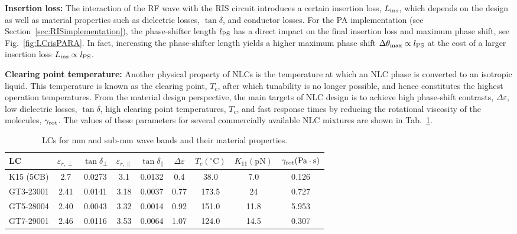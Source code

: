 \textbf{Insertion loss:} The interaction of the \gls{RF} wave with the \gls{RIS} circuit introduces a certain insertion loss, $L_{\rm ins}$, which depends on the design as well as material properties such as dielectric losses, $\tan\delta$, and conductor losses. For the \gls{PA} implementation (see Section~\ref{sec:RISimplementation}), the phase-shifter length $l_{\rm PS}$ has a direct impact on the final insertion loss and maximum phase shift, see Fig.~\ref{fig:LCrisPARA}. In fact, increasing the phase-shifter length yields a higher maximum phase shift $\Delta\theta_{\max}\propto l_{\rm PS}$ at the cost of a larger insertion loss $L_{\rm ins} \propto l_{\rm PS}$. 

\textbf{Clearing point temperature:} Another physical property of \glspl{NLC} is the temperature at which an \gls{NLC} phase is converted to an isotropic liquid.  This temperature is known as the clearing point, $T_c$, after which tunability is no longer possible, and hence constitutes the highest operation temperatures. 
From the material design perspective, the main targets of \gls{NLC} design is to achieve high phase-shift contrasts, $\Delta\varepsilon $, low dielectric losses, $\tan\delta$, high clearing point temperatures, $T_c$,  and fast response times by reducing the rotational viscosity of the molecules, $\gamma_{\rm rot}$. 
The values of these parameters for several commercially available \gls{NLC} mixtures are shown in Tab.~\ref{tab:LCtypes}.

\begin{table}
\centering
\caption{LCs for mm and sub-mm wave bands and their material properties. \cite{jakoby2020microwave}}
\label{tab:LCtypes}
\begin{tabular}{@{}lcccccccc@{}} \toprule
LC        & $\varepsilon_{r,\perp}$ & $\tan\delta_\perp$ & $\varepsilon_{r,\parallel}$ & $\tan\delta_\parallel$ & {$\Delta \varepsilon$} & $T_c (^\circ \text{C})$&  $K_{11} (\text{pN})$  &  $\gamma_{\rm rot} (\text{Pa} \cdot \text{s})$ \\ \midrule %
K15 (5CB) & 2.7                     & 0.0273            & 3.1                         & 0.0132                & 0.4                  & 38.0            &    7.0          & 0.126                          \\
GT3-23001 & 2.41                    & 0.0141            & 3.18                        & 0.0037                & 0.77                 & 173.5           &    24           & 0.727                          \\
GT5-28004 & 2.40                    & 0.0043            & 3.32                        & 0.0014                & 0.92                 & 151.0           &    11.8         & 5.953                          \\
GT7-29001 & 2.46                    & 0.0116            & 3.53                        & 0.0064                & 1.07                 & 124.0           &    14.5         & 0.307                        \\ \bottomrule
\end{tabular}
\end{table}

